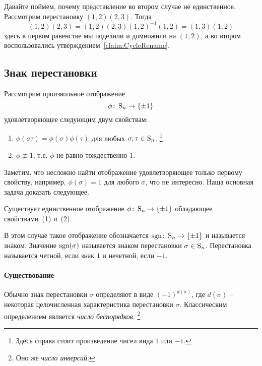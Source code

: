 Давайте поймем, почему представление во втором случае не единственное.
Рассмотрим перестановку $(1,2)(2,3)$.
Тогда
\[
(1,2)(2,3) = (1,2)(2,3)(1,2)^{-1}(1,2) = (1,3)(1,2)
\]
здесь в первом равенстве мы поделили и домножили на $(1,2)$, а во втором воспользовались утверждением~\ref{claim:CycleRename}.

\subsection{Знак перестановки}

Рассмотрим произвольное отображение 
\[
\phi\colon \operatorname{S}_{n}\to \{\pm 1\}
\]
удовлетворяющее следующим двум свойствам:
\begin{enumerate}
\item $\phi(\sigma \tau) = \phi(\sigma)\phi(\tau)$ для любых $\sigma, \tau \in\operatorname{S}_{n}$.%
\footnote{Здесь справа стоит произведение чисел вида $1$ или $-1$.}

\item $\phi\not\equiv 1$, т.е. $\phi$ не равно тождественно $1$.
\end{enumerate}
Заметим, что несложно найти отображение удовлетворяющее только первому свойству, например, $\phi(\sigma) = 1$ для любого $\sigma$, что не интересно.
Наша основная задача доказать следующее.

\begin{claim}
Существует единственное отображение $\phi\colon \operatorname{S}_{n} \to \{\pm 1\}$ обладающее свойствами~(1) и~(2).
\end{claim}

В этом случае такое отображение обозначается $\operatorname{sgn}\colon \operatorname{S}_{n}\to \{\pm1\}$ и называется знаком.
Значение $\operatorname{sgn}(\sigma)$ называется знаком перестановки $\sigma\in\operatorname{S}_{n}$.
Перестановка называется четной, если знак $1$ и нечетной, если $-1$.



\paragraph{Существование}

Обычно знак перестановки $\sigma$ определяют в виде $(-1)^{d(\sigma)}$, где $d(\sigma)$ -- некоторая целочисленная характеристика перестановки $\sigma$.
Классическим определением является {\it число беспорядков}.%
\footnote{Оно же {\it число инверсий}.} 

